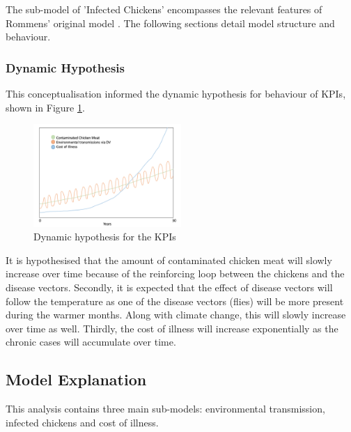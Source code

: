 The sub-model of 'Infected Chickens' encompasses the relevant features of Rommens' original model \parencite{rommens_infected_2020}. The following sections detail model structure and behaviour. 

\subsubsection*{Dynamic Hypothesis}

This conceptualisation informed the dynamic hypothesis for behaviour of KPIs, shown in Figure \ref{fig:dynamic_hypothesis}. 

\begin{figure}[h]
\centering
\includegraphics[width=0.50\textwidth]{images/KPI_dynamic_hypo.png}
\caption{Dynamic hypothesis for the KPIs}
\label{fig:dynamic_hypothesis}
\end{figure}

It is hypothesised that the amount of contaminated chicken meat will slowly increase over time because of the reinforcing loop between the chickens and the disease vectors. 
Secondly, it is expected that the effect of disease vectors will follow the temperature as one of the disease vectors (flies) will be more present during the warmer months. Along with climate change, this will slowly increase over time as well. 
Thirdly, the cost of illness will increase exponentially as the chronic cases will accumulate over time. 


\subsection{Model Explanation}
   
This analysis contains three main sub-models: environmental transmission, infected chickens and cost of illness. 

